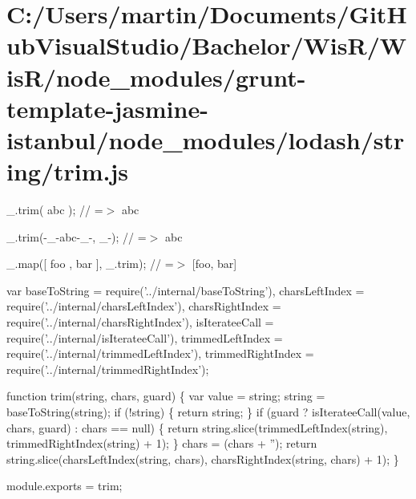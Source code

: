 \hypertarget{_c_1_2_users_2martin_2_documents_2_git_hub_visual_studio_2_bachelor_2_wis_r_2_wis_r_2node_modulee63aea90e92167677bdd49bb5c090a82}{}\section{C\+:/\+Users/martin/\+Documents/\+Git\+Hub\+Visual\+Studio/\+Bachelor/\+Wis\+R/\+Wis\+R/node\+\_\+modules/grunt-\/template-\/jasmine-\/istanbul/node\+\_\+modules/lodash/string/trim.\+js}
\+\_\+.\+trim(\textquotesingle{} abc \textquotesingle{}); // =$>$ \textquotesingle{}abc\textquotesingle{}

\+\_\+.\+trim(\textquotesingle{}-\/\+\_\+-\/abc-\/\+\_\+-\/\textquotesingle{}, \textquotesingle{}\+\_\+-\/\textquotesingle{}); // =$>$ \textquotesingle{}abc\textquotesingle{}

\+\_\+.\+map(\mbox{[}\textquotesingle{} foo \textquotesingle{}, \textquotesingle{} bar \textquotesingle{}\mbox{]}, \+\_\+.\+trim); // =$>$ \mbox{[}\textquotesingle{}foo\textquotesingle{}, \textquotesingle{}bar\textquotesingle{}\mbox{]}


\begin{DoxyCodeInclude}
var baseToString = require(\textcolor{stringliteral}{'../internal/baseToString'}),
    charsLeftIndex = require(\textcolor{stringliteral}{'../internal/charsLeftIndex'}),
    charsRightIndex = require(\textcolor{stringliteral}{'../internal/charsRightIndex'}),
    isIterateeCall = require(\textcolor{stringliteral}{'../internal/isIterateeCall'}),
    trimmedLeftIndex = require(\textcolor{stringliteral}{'../internal/trimmedLeftIndex'}),
    trimmedRightIndex = require(\textcolor{stringliteral}{'../internal/trimmedRightIndex'});

\textcolor{keyword}{function} trim(\textcolor{keywordtype}{string}, chars, guard) \{
  var value = string;
  \textcolor{keywordtype}{string} = baseToString(\textcolor{keywordtype}{string});
  \textcolor{keywordflow}{if} (!\textcolor{keywordtype}{string}) \{
    \textcolor{keywordflow}{return} string;
  \}
  \textcolor{keywordflow}{if} (guard ? isIterateeCall(value, chars, guard) : chars == null) \{
    \textcolor{keywordflow}{return} \textcolor{keywordtype}{string}.slice(trimmedLeftIndex(\textcolor{keywordtype}{string}), trimmedRightIndex(\textcolor{keywordtype}{string}) + 1);
  \}
  chars = (chars + \textcolor{stringliteral}{''});
  \textcolor{keywordflow}{return} \textcolor{keywordtype}{string}.slice(charsLeftIndex(\textcolor{keywordtype}{string}, chars), charsRightIndex(\textcolor{keywordtype}{string}, chars) + 1);
\}

module.exports = trim;
\end{DoxyCodeInclude}
 